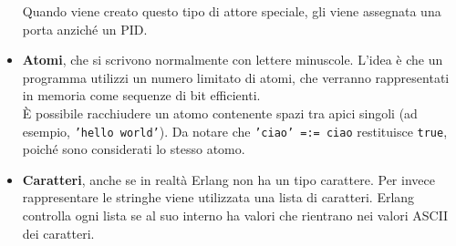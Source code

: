 \documentclass{article}
\begin{document}
\begin{itemize}
    Quando viene creato questo tipo di attore speciale, gli viene assegnata una porta anziché un PID.
    \item \textbf{Atomi}, che si scrivono normalmente con lettere minuscole. L'idea è che un programma utilizzi un numero limitato di atomi, che verranno rappresentati in memoria come sequenze di bit efficienti.\\
    È possibile racchiudere un atomo contenente spazi tra apici singoli (ad esempio, \texttt{'hello world'}). Da notare che \texttt{'ciao' =:= ciao} restituisce \texttt{true}, poiché sono considerati lo stesso atomo.
    \item \textbf{Caratteri}, anche se in realtà Erlang non ha un tipo carattere. Per invece rappresentare le stringhe viene utilizzata una lista di caratteri. Erlang controlla ogni lista se al suo interno ha valori che rientrano nei valori ASCII dei caratteri.
\end{itemize}
\end{document}
